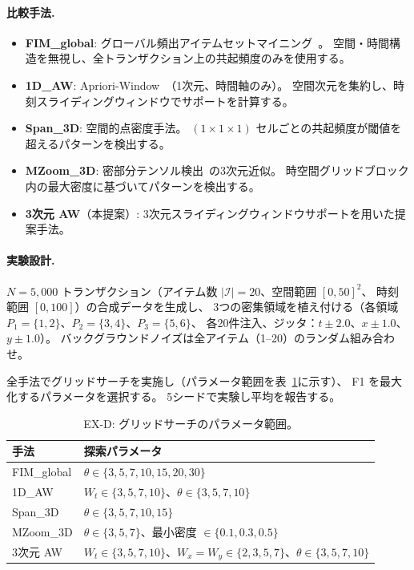\paragraph{比較手法.}
\begin{itemize}
\item \textbf{FIM\_global}: グローバル頻出アイテムセットマイニング~\cite{agrawal1994apriori}。
  空間・時間構造を無視し、全トランザクション上の共起頻度のみを使用する。
\item \textbf{1D\_AW}: Apriori-Window~\cite{aprioriwindow}（1次元、時間軸のみ）。
  空間次元を集約し、時刻スライディングウィンドウでサポートを計算する。
\item \textbf{Span\_3D}: 空間的点密度手法。
  $(1 \times 1 \times 1)$ セルごとの共起頻度が閾値を超えるパターンを検出する。
\item \textbf{MZoom\_3D}: 密部分テンソル検出~\cite{shin2018mzoom}の3次元近似。
  時空間グリッドブロック内の最大密度に基づいてパターンを検出する。
\item \textbf{3次元 AW}（本提案）: 3次元スライディングウィンドウサポートを用いた提案手法。
\end{itemize}

\paragraph{実験設計.}
$N = 5{,}000$ トランザクション（アイテム数 $|\mathcal{I}| = 20$、空間範囲 $[0, 50]^2$、
時刻範囲 $[0, 100]$）の合成データを生成し、
3つの密集領域を植え付ける（各領域 $P_1 = \{1,2\}$、$P_2 = \{3,4\}$、$P_3 = \{5,6\}$、
各20件注入、ジッタ：$t \pm 2.0$、$x \pm 1.0$、$y \pm 1.0$）。
バックグラウンドノイズは全アイテム（1--20）のランダム組み合わせ。

全手法でグリッドサーチを実施し（パラメータ範囲を表~\ref{tab:ex_d_grid}に示す）、
F1 を最大化するパラメータを選択する。
5シードで実験し平均を報告する。

\begin{table}[t]
\centering
\caption{EX-D: グリッドサーチのパラメータ範囲。}
\label{tab:ex_d_grid}
\small
\begin{tabular}{lp{6cm}}
\toprule
手法 & 探索パラメータ \\
\midrule
FIM\_global   & $\theta \in \{3,5,7,10,15,20,30\}$ \\
1D\_AW        & $W_t \in \{3,5,7,10\}$、$\theta \in \{3,5,7,10\}$ \\
Span\_3D      & $\theta \in \{3,5,7,10,15\}$ \\
MZoom\_3D     & $\theta \in \{3,5,7\}$、最小密度 $\in \{0.1,0.3,0.5\}$ \\
3次元 AW      & $W_t \in \{3,5,7,10\}$、$W_x{=}W_y \in \{2,3,5,7\}$、$\theta \in \{3,5,7,10\}$ \\
\bottomrule
\end{tabular}
\end{table}

